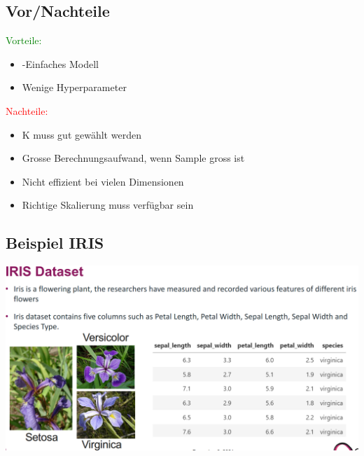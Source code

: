 \subsection{Vor/Nachteile}
\textcolor{green}{Vorteile:}\\
\begin{itemize}
\item -Einfaches Modell
\item Wenige Hyperparameter
\end{itemize}

\textcolor{red}{Nachteile:}
\begin{itemize}
\item K muss gut gewählt werden
\item Grosse Berechnungsaufwand, wenn Sample gross ist
\item Nicht effizient bei vielen Dimensionen
\item Richtige Skalierung muss verfügbar sein
\end{itemize}

\subsection{Beispiel IRIS}
\includegraphics[width=\linewidth]{img/iris.png}